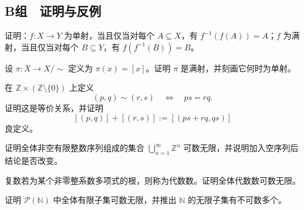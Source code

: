 \subsection*{B组　证明与反例}
\begin{enumerate}[label=\textbf{\thechapter.\arabic*.},resume]
   证明：\(f:X\to Y\) 为单射，当且仅当对每个 \(A\subseteq X\)，有 \(f^{-1}(f(A))=A\)；\(f\) 为满射，当且仅当对每个 \(B\subseteq Y\)，有 \(f(f^{-1}(B))=B\)。

   设 \(\pi:X\to X/{\sim}\) 定义为 \(\pi(x)=[x]\)。证明 \(\pi\) 是满射，并刻画它何时为单射。

   在 \(\mathbb Z\times(\mathbb Z\setminus\{0\})\) 上定义
  \[
    (p,q)\sim(r,s)\quad\Longleftrightarrow\quad ps=rq.
  \]
  证明这是等价关系，并证明
  \[
    [(p,q)]+[(r,s)]:=[(ps+rq,qs)]
  \]
  良定义。

   证明全体非空有限整数序列组成的集合 \(\bigcup_{n=1}^{\infty}\mathbb Z^n\) 可数无限，并说明加入空序列后结论是否改变。

   复数若为某个非零整系数多项式的根，则称为代数数。证明全体代数数可数无限。

   证明 \(\mathcal P(\mathbb N)\) 中全体有限子集可数无限，并推出 \(\mathbb N\) 的无限子集有不可数多个。
\end{enumerate}

